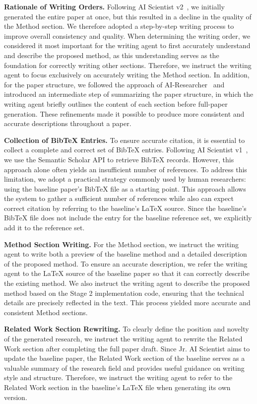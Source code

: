 \textbf{Rationale of Writing Orders.}
Following AI Scientist v2~\citep{yamada2025ai}, we initially generated the entire paper at once, but this resulted in a decline in the quality of the Method section. We therefore adopted a step-by-step writing process to improve overall consistency and quality.
When determining the writing order, we considered it most important for the writing agent to first accurately understand and describe the proposed method, as this understanding serves as the foundation for correctly writing other sections.
Therefore, we instruct the writing agent to focus exclusively on accurately writing the Method section.
In addition, for the paper structure, we followed the approach of AI-Researcher~\citep{tang2025ai} and introduced an intermediate step of summarizing the paper structure, in which the writing agent briefly outlines the content of each section before full-paper generation.
These refinements made it possible to produce more consistent and accurate descriptions throughout a paper.

\textbf{Collection of BibTeX Entries.}
To ensure accurate citation, it is essential to collect a complete and correct set of BibTeX entries.
Following AI Scientist v1~\citep{lu2024ai}, we use the Semantic Scholar API to retrieve BibTeX records.
However, this approach alone often yields an insufficient number of references.
To address this limitation, we adopt a practical strategy commonly used by human researchers: using the baseline paper's BibTeX file as a starting point.
This approach allows the system to gather a sufficient number of references while also can expect correct citation by referring to the baseline's LaTeX source.
Since the baseline's BibTeX file does not include the entry for the baseline reference set, we explicitly add it to the reference set.

\textbf{Method Section Writing.}
For the Method section, we instruct the writing agent to write both a preview of the baseline method and a detailed description of the proposed method. To ensure an accurate description, we refer the writing agent to the LaTeX source of the baseline paper so that it can correctly describe the existing method. We also instruct the writing agent to describe the proposed method based on the Stage 2 implementation code, ensuring that the technical details are precisely reflected in the text. This process yielded more accurate and consistent Method sections.

\textbf{Related Work Section Rewriting.}
To clearly define the position and novelty of the generated research, we instruct the writing agent to rewrite the Related Work section after completing the full paper draft.
Since Jr. AI Scientist aims to update the baseline paper, the Related Work section of the baseline serves as a valuable summary of the research field and provides useful guidance on writing style and structure. Therefore, we instruct the writing agent to refer to the Related Work section in the baseline's LaTeX file when generating its own version.

